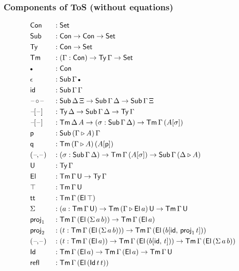 \documentclass[12pt,a4paper,twoside,openany]{book}
\theoremstyle{remark}
\theoremstyle{definition}
\theoremstyle{theorem}
\newcommand{\refl}{\mathsf{refl}}
\newcommand{\id}{\mathsf{id}}
\newcommand{\Con}{\mathsf{Con}}
\newcommand{\Sub}{\mathsf{Sub}}
\newcommand{\Tm}{\mathsf{Tm}}
\newcommand{\Ty}{\mathsf{Ty}}
\newcommand{\U}{\mathsf{U}}
\newcommand{\El}{\mathsf{El}}
\newcommand{\Id}{\mathsf{Id}}
\newcommand{\proj}{\mathsf{proj}}
\renewcommand{\tt}{\mathsf{tt}}
\newcommand{\blank}{\mathord{\hspace{1pt}\text{--}\hspace{1pt}}}
\newcommand{\Set}{\mathsf{Set}}
\newcommand{\ext}{\triangleright}
\newcommand{\emptycon}{\scaleobj{.75}\bullet}
\newcommand{\p}{\mathsf{p}}
\newcommand{\q}{\mathsf{q}}
\begin{document}
\subsubsection{Components of ToS (without equations)}
\vspace{-0.5em}
\begin{alignat*}{3}
  &\Con &&: \Set\\
  &\Sub &&: \Con \to \Con \to \Set\\
  &\Ty  &&: \Con \to \Set\\
  &\Tm  &&: (\Gamma : \Con) \to \Ty\,\Gamma \to \Set \\
  &\emptycon &&: \Con\\
  &\epsilon &&: \Sub\,\Gamma\,\emptycon\\
  &\id &&: \Sub\,\Gamma\,\Gamma\\
  &\blank\!\circ\!\blank &&: \Sub\,\Delta\,\Xi \to \Sub\,\Gamma\,\Delta \to \Sub\,\Gamma\,\Xi\\
  &\blank\![\blank] &&: \Ty\,\Delta \to \Sub\,\Gamma\,\Delta \to \Ty\,\Gamma\\
  &\blank\![\blank] &&: \Tm\,\Delta\,A \to (\sigma : \Sub\,\Gamma\,\Delta) \to \Tm\,\Gamma\,(A[\sigma])\\
  &\p &&: \Sub\,(\Gamma\ext A)\,\Gamma\\
  &\q &&: \Tm\,(\Gamma\ext A)\,(A[\p])\\
  &(\blank\!,\!\blank) &&: (\sigma : \Sub\,\Gamma\,\Delta) \to \Tm\,\Gamma\,(A[\sigma]) \to \Sub\,\Gamma\,(\Delta\ext A)\\
  &\U &&: \Ty\,\Gamma\\
  &\El &&: \Tm\,\Gamma\,\U \to \Ty\,\Gamma\\
  &\top &&: \Tm\,\Gamma\,\U\\
  &\tt  &&: \Tm\,\Gamma\,(\El\,\top)\\
  &\Sigma &&: (a : \Tm\,\Gamma\,\U) \to \Tm\,(\Gamma \ext \El\,a)\,\U \to \Tm\,\Gamma\,\U\\
  &\proj_1 &&: \Tm\,\Gamma\,(\El\,(\Sigma\,a\,b)) \to \Tm\,\Gamma\,(\El\,a)\\
  &\proj_2 &&: (t : \Tm\,\Gamma\,(\El\,(\Sigma\,a\,b))) \to \Tm\,\Gamma\,(\El\,(b[\id,\,\proj_1\,t]))\\
  &(\blank\!,\!\blank) &&: (t : \Tm\,\Gamma\,(\El\,a)) \to \Tm\,\Gamma\,(\El\,(b[\id,\,t])) \to \Tm\,\Gamma\,(\El\,(\Sigma\,a\,b))\\
  &\Id &&: \Tm\,\Gamma\,(\El\,a) \to \Tm\,\Gamma\,(\El\,a) \to \Tm\,\Gamma\,\U\\
  &\refl &&: \Tm\,\Gamma\,(\El\,(\Id\,t\,t))\\

\end{alignat*}
\end{document}
